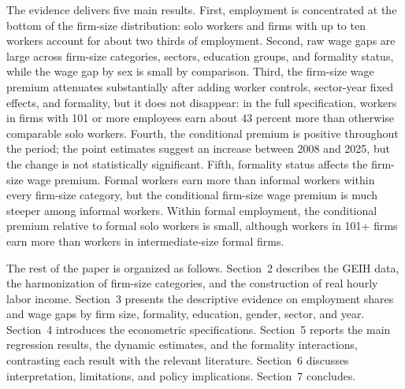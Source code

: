 The evidence delivers five main results. First, employment is concentrated at the bottom of the firm-size distribution: solo workers and firms with up to ten workers account for about two thirds of employment. Second, raw wage gaps are large across firm-size categories, sectors, education groups, and formality status, while the wage gap by sex is small by comparison. Third, the firm-size wage premium attenuates substantially after adding worker controls, sector-year fixed effects, and formality, but it does not disappear: in the full specification, workers in firms with 101 or more employees earn about 43 percent more than otherwise comparable solo workers. Fourth, the conditional premium is positive throughout the period; the point estimates suggest an increase between 2008 and 2025, but the change is not statistically significant. Fifth, formality status affects the firm-size wage premium. Formal workers earn more than informal workers within every firm-size category, but the conditional firm-size wage premium is much steeper among informal workers. Within formal employment, the conditional premium relative to formal solo workers is small, although workers in 101+ firms earn more than workers in intermediate-size formal firms.

The rest of the paper is organized as follows. Section~2 describes the GEIH data, the harmonization of firm-size categories, and the construction of real hourly labor income. Section~3 presents the descriptive evidence on employment shares and wage gaps by firm size, formality, education, gender, sector, and year. Section~4 introduces the econometric specifications. Section~5 reports the main regression results, the dynamic estimates, and the formality interactions, contrasting each result with the relevant literature. Section~6 discusses interpretation, limitations, and policy implications. Section~7 concludes.
